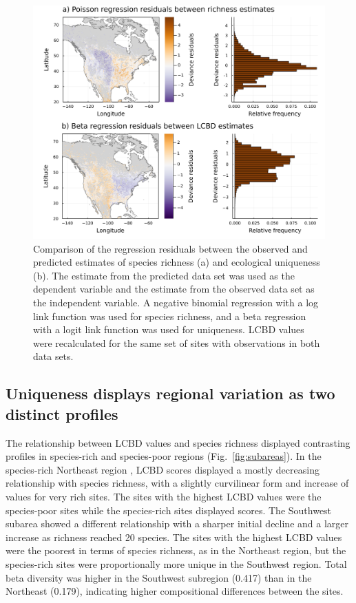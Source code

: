 \documentclass[11pt]{article}
\makeatletter
\def\maxwidth{\ifdim\Gin@nat@width>\linewidth\linewidth
\else\Gin@nat@width\fi}
\let\Oldincludegraphics\includegraphics
\renewcommand{\includegraphics}[1]{\Oldincludegraphics[width=\maxwidth]{#1}}
\makeatother
\begin{document}
\begin{figure}
\hypertarget{fig:residuals-combined}{%
\centering
\includegraphics{figures/comparison-residuals.png}
\caption{Comparison of the regression residuals between the observed and
predicted estimates of species richness (a) and ecological uniqueness
(b). The estimate from the predicted data set was used as the dependent
variable and the estimate from the observed data set as the independent
variable. A negative binomial regression with a log link function was
used for species richness, and a beta regression with a logit link
function was used for uniqueness. LCBD values were recalculated for the
same set of sites with observations in both data
sets.}\label{fig:residuals-combined}
}
\end{figure}

\hypertarget{uniqueness-displays-regional-variation-as-two-distinct-profiles}{%
\subsection{Uniqueness displays regional variation as two distinct
profiles}\label{uniqueness-displays-regional-variation-as-two-distinct-profiles}}

The relationship between LCBD values and species richness displayed
contrasting profiles in species-rich and species-poor regions
(Fig.~\ref{fig:subareas}). In the species-rich Northeast region , LCBD
scores displayed a mostly decreasing relationship with species richness,
with a slightly curvilinear form and increase of values for very rich
sites. The sites with the highest LCBD values were the species-poor
sites while the species-rich sites displayed scores. The Southwest
subarea showed a different relationship with a sharper initial decline
and a larger increase as richness reached 20 species. The sites with the
highest LCBD values were the poorest in terms of species richness, as in
the Northeast region, but the species-rich sites were proportionally
more unique in the Southwest region. Total beta diversity was higher in
the Southwest subregion (0.417) than in the Northeast (0.179),
indicating higher compositional differences between the sites.
\end{document}
